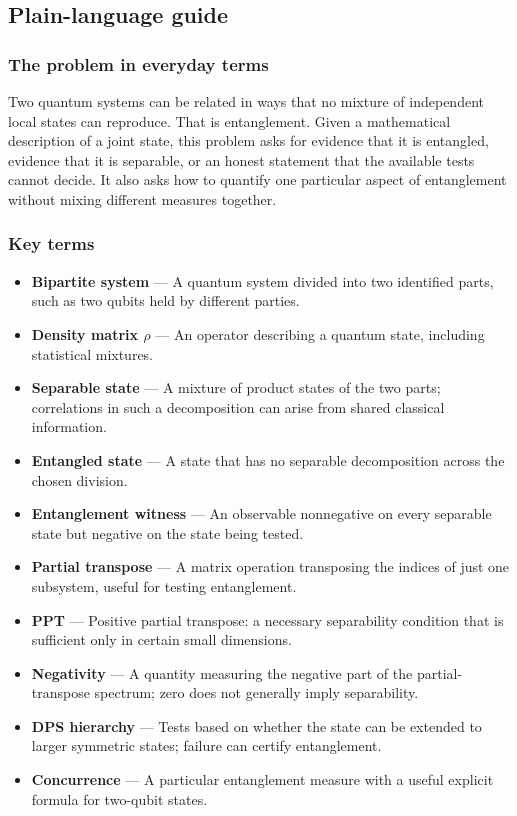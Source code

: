 \documentclass[
  11pt,
]{article}
\begin{document}
\subsection{Plain-language guide}

\subsubsection{The problem in everyday terms}

Two quantum systems can be related in ways that no mixture of
independent local states can reproduce. That is entanglement. Given a
mathematical description of a joint state, this problem asks for
evidence that it is entangled, evidence that it is separable, or an
honest statement that the available tests cannot decide. It also asks
how to quantify one particular aspect of entanglement without mixing
different measures together.

\subsubsection{Key terms}

\begin{itemize}
\item
  \textbf{Bipartite system} --- A quantum system divided into two
  identified parts, such as two qubits held by different parties.
\item
  \textbf{Density matrix \ensuremath{\rho}} --- An operator describing a
  quantum state, including statistical mixtures.
\item
  \textbf{Separable state} --- A mixture of product states of the two
  parts; correlations in such a decomposition can arise from shared
  classical information.
\item
  \textbf{Entangled state} --- A state that has no separable
  decomposition across the chosen division.
\item
  \textbf{Entanglement witness} --- An observable nonnegative on every
  separable state but negative on the state being tested.
\item
  \textbf{Partial transpose} --- A matrix operation transposing the
  indices of just one subsystem, useful for testing entanglement.
\item
  \textbf{PPT} --- Positive partial transpose: a necessary separability
  condition that is sufficient only in certain small dimensions.
\item
  \textbf{Negativity} --- A quantity measuring the negative part of the
  partial-transpose spectrum; zero does not generally imply
  separability.
\item
  \textbf{DPS hierarchy} --- Tests based on whether the state can be
  extended to larger symmetric states; failure can certify entanglement.
\item
  \textbf{Concurrence} --- A particular entanglement measure with a
  useful explicit formula for two-qubit states.
\end{itemize}
\end{document}
